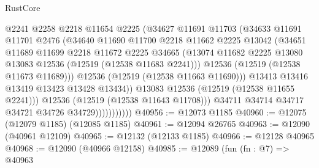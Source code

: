 \begin{lexlean}{RustCore}
\begin{coremodule}
                              @2241
                              @2258
                              @2218
                              @11654
                              @2225
                              (@34627
                                @11691
                                @11703
                                (@34633
                                  @11691
                                  @11701
                                  @2476
                                  (@34640
                                    @11690
                                    @11700
                                    @2218
                                    @11662
                                    @2225
                                    @13042
                                    (@34651
                                      @11689
                                      @11699
                                      @2218
                                      @11672
                                      @2225
                                      @34665
                                      (@13074
                                        @11682
                                        @2225
                                        @13080
                                        @13083
                                        @12536
                                        (@12519 (@12538 @11683 @2241)))
                                      @12536
                                      (@12519 (@12538 @11673 @11689)))
                                    @12536
                                    (@12519 (@12538 @11663 @11690)))
                                  @13413
                                  @13416
                                  @13419
                                  @13423
                                  @13428
                                  @13434))
                              @13083
                              @12536
                              (@12519 (@12538 @11655 @2241)))
                            @12536
                            (@12519 (@12538 @11643 @11708)))
                          @34711
                          @34714
                          @34717
                          @34721
                          @34726
                          @34729)))))))))))
@40956 := @12073 @1185
@40960 := @12075 (@12079 @1185) (@12085 @1185)
@40961 := @12094 @26765
@40963 := @12090 (@40961 @12109)
@40965 := @12132 (@12133 @1185)
@40966 := @12128 @40965
@40968 := @12090 (@40966 @12158)
@40985 := @12089
    (fun (fn : @7) =>
    @40963

\end{coremodule}
\end{lexlean}
